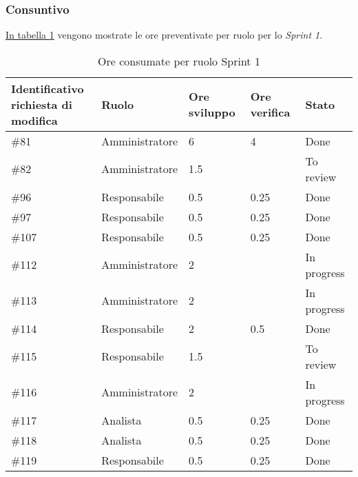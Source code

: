 \subsubsection{Consuntivo}

\hyperref[tab:sprint1_ore_consumate]{In tabella \ref{tab:sprint1_ore_consumate}} vengono mostrate le ore preventivate per ruolo per lo \textit{Sprint 1}.

\begin{table}[H]
    \centering
        \begin{tabular}{| l | l | l | l | l |}
            \hline
            \makecell{\textbf{Identificativo} \\ \textbf{richiesta di modifica}} &
                \textbf{Ruolo} & 
                \textbf{Ore sviluppo} &
                \textbf{Ore verifica} & 
                \textbf{Stato}\\ 
    \hline
        \#81 & Amministratore & 6 & 4 & Done\\
    \hline
        \#82 & Amministratore& 1.5 &  & To review\\
    \hline
        \#96 & Responsabile & 0.5 & 0.25 & Done\\
    \hline
        \#97 & Responsabile & 0.5 & 0.25 & Done\\
    \hline
        \#107 & Responsabile & 0.5 & 0.25 & Done\\
    \hline
        \#112 & Amministratore & 2 & & In progress\\
    \hline
        \#113 & Amministratore & 2 & & In progress\\
    \hline
        \#114 & Responsabile & 2 & 0.5 & Done\\
    \hline
        \#115 & Responsabile & 1.5 & & To review\\
    \hline
        \#116 & Amministratore & 2 & & In progress\\
    \hline
        \#117 & Analista & 0.5 & 0.25 & Done\\
    \hline
        \#118 & Analista & 0.5 & 0.25 & Done\\
    \hline
        \#119 & Responsabile & 0.5 & 0.25 & Done\\
    \hline
    \end{tabular}
    \caption{Ore consumate per ruolo Sprint 1}
    \label{tab:sprint1_ore_consumate} 
\end{table}